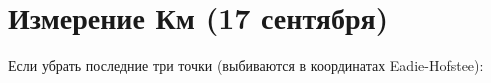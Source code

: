 \section{Измерение Км (17 сентября)}









Если убрать последние три точки (выбиваются в координатах Eadie-Hofstee):









